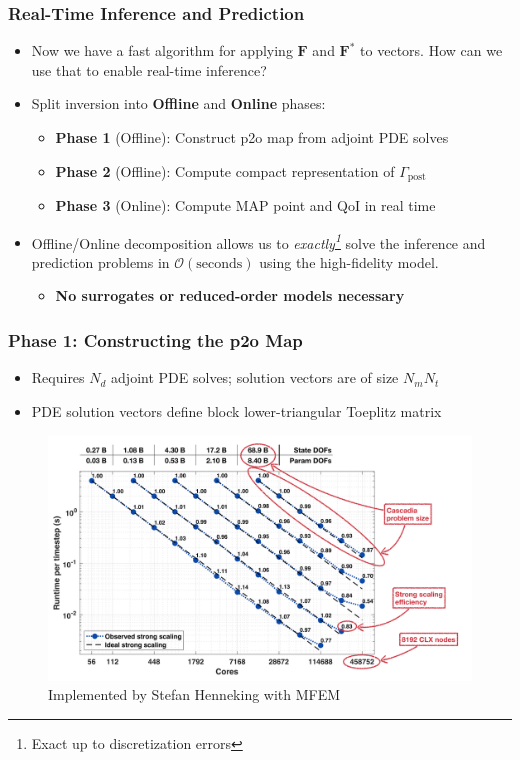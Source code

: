 \begin{frame}
    \frametitle{Real-Time Inference and Prediction}
    \begin{itemize}
        \item Now we have a fast algorithm for applying \(\mathbf{F}\) and \(\mathbf{F}^*\) to vectors. How can we use that to enable real-time inference?
        \item Split inversion into \textbf{Offline} and \textbf{Online} phases:
        \begin{itemize}
            \item \textbf{Phase 1} (Offline): Construct p2o map from adjoint PDE solves
            \item \textbf{Phase 2} (Offline): Compute compact representation of \(\Gamma_{\!\text{post}}\)
            \item \textbf{Phase 3} (Online): Compute MAP point and QoI in real time
        \end{itemize}
        \item Offline/Online decomposition allows us to \emph{exactly\footnote{Exact up to discretization errors}} solve the inference and prediction problems in \(\mathcal{O}(\text{seconds})\) using the high-fidelity model.
        \begin{itemize}
            \item \textbf{No surrogates or reduced-order models necessary}
        \end{itemize}
    \end{itemize}
\end{frame}

\begin{frame}
    \frametitle{Phase 1: Constructing the p2o Map}
    \begin{itemize}
        \item Requires \(N_d\) adjoint PDE solves; solution vectors are of size \(N_mN_t\)
        \item PDE solution vectors define block lower-triangular Toeplitz matrix
    \end{itemize}
    \begin{figure}
        \includegraphics[width=\textwidth]{JMM/images/pde/Strong_Scaling.svg}
        \caption{Implemented by Stefan Henneking with MFEM}
    \end{figure}
\end{frame}
